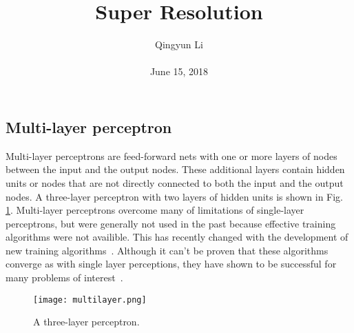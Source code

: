 \documentclass[10pt,twocolumn,letterpaper]{article}
\begin{document}
\author{Qingyun Li\\\\
June 15, 2018}        
\title{Super Resolution}

\maketitle

\subsection{Multi-layer perceptron}
\par Multi-layer perceptrons are feed-forward nets with one or more layers of nodes between the input and the output nodes. These additional layers contain hidden units or nodes that are not directly connected to both the input and the output nodes. A three-layer perceptron with two layers of hidden units is shown in Fig. \ref{multi}. Multi-layer perceptrons overcome many of limitations of single-layer perceptrons, but were generally not used in the past because effective training algorithms were not availible. This has recently changed with the development of new training algorithms~\cite{Rumelhart1988Learning}. Although it can't be proven that these algorithms converge as with single layer perceptions, they have shown to be successful for many problems of interest~\cite{Rumelhart1988Learning}.
\begin{figure}[htbp]
 \centering{}
\texttt{[image: multilayer.png]}\\
 \caption{A three-layer perceptron.}
\label{multi}
\end{figure}
 
 
\end{document}
